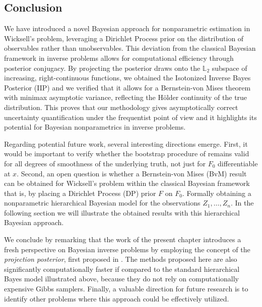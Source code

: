 \subsection{Conclusion}

We have introduced a novel Bayesian approach for nonparametric estimation in Wicksell's problem, leveraging a Dirichlet Process prior on the distribution of observables rather than unobservables. This deviation from the classical Bayesian framework in inverse problems allows for computational efficiency through posterior conjugacy. By projecting the posterior draws onto the \( \mathbb{L}_2 \) subspace of increasing, right-continuous functions, we obtained the Isotonized Inverse Bayes Posterior (IIP) and we verified that it allows for a Bernstein-von Mises theorem with minimax asymptotic variance, reflecting the H\"{o}lder continuity of the true distribution. This proves that our methodology gives asymptotically correct uncertainty quantification under the frequentist point of view and it highlights its potential for Bayesian nonparametrics in inverse problems. 

Regarding potential future work, several interesting directions emerge. First, it would be important to verify whether the bootstrap procedure of \cite{19} remains valid for all degrees of smoothness of the underlying truth, not just for $F_0$ differentiable at $x$. Second, an open question is whether a Bernstein-von Mises (BvM) result can be obtained for Wicksell's problem within the classical Bayesian framework that is, by placing a Dirichlet Process (DP) prior $F$ on \( F_0 \). Formally obtaining a nonparametric hierarchical Bayesian model for the observations $Z_1,\ldots,Z_n$. In the following section we will illustrate the obtained results with this hierarchical Bayesian approach.

We conclude by remarking that the work of the present chapter introduces a fresh perspective on Bayesian inverse problems by employing the concept of the \textit{projection posterior}, first proposed in \cite{54}. The methods proposed here are also significantly computationally faster if compared to the standard hierarchical Bayes model illustrated above, because they do not rely on computationally expensive Gibbs samplers. Finally, a valuable direction for future research is to identify other problems where this approach could be effectively utilized.



